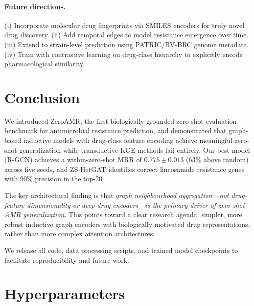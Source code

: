 \documentclass[conference]{IEEEtran}
\begin{document}
\paragraph{Future directions.}
(i) Incorporate molecular drug fingerprints via SMILES encoders for
truly novel drug discovery.
(ii) Add temporal edges to model resistance emergence over time.
(iii) Extend to strain-level prediction using PATRIC/BV-BRC genome
metadata.
(iv) Train with contrastive learning on drug-class hierarchy to
explicitly encode pharmacological similarity.


\section{Conclusion}
We introduced ZeroAMR, the first biologically grounded zero-shot
evaluation benchmark for antimicrobial resistance prediction, and
demonstrated that graph-based inductive models with drug-class feature
encoding achieve meaningful zero-shot generalization while transductive
KGE methods fail entirely. Our best model (R-GCN) achieves a
within-zero-shot MRR of $0.775 \pm 0.013$ (63\% above random) across
five seeds, and ZS-HetGAT identifies correct lincosamide resistance
genes with 90\% precision in the top-20.

The key architectural finding is that \emph{graph neighbourhood
aggregation—not drug-feature dimensionality or deep drug encoders—is
the primary driver of zero-shot AMR generalization}. This points toward
a clear research agenda: simpler, more robust inductive graph encoders
with biologically motivated drug representations, rather than more
complex attention architectures.

We release all code, data processing scripts, and trained model
checkpoints to facilitate reproducibility and future work.


\appendix
\section{Hyperparameters}
\label{app:hparams}
\end{document}
